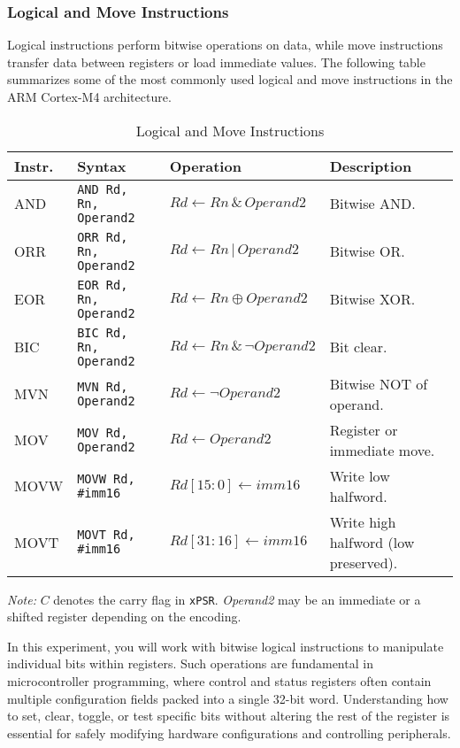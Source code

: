 \subsubsection{Logical and Move Instructions}
Logical instructions perform bitwise operations on data, while move instructions transfer data between registers or load immediate values. The following table summarizes some of the most commonly used logical and move instructions in the ARM Cortex-M4 architecture.
\begin{table}[H]
\centering
\caption{Logical and Move Instructions}
\small
\begin{tabularx}{\linewidth}{@{}l l l X@{}}
\toprule
\textbf{Instr.} & \textbf{Syntax} & \textbf{Operation} & \textbf{Description} \\
\midrule
AND  & \texttt{AND Rd, Rn, Operand2} & $Rd \leftarrow Rn \,\&\, Operand2$ & Bitwise AND. \\
ORR  & \texttt{ORR Rd, Rn, Operand2} & $Rd \leftarrow Rn \,|\, Operand2$ & Bitwise OR. \\
EOR  & \texttt{EOR Rd, Rn, Operand2} & $Rd \leftarrow Rn \oplus Operand2$ & Bitwise XOR. \\
BIC  & \texttt{BIC Rd, Rn, Operand2} & $Rd \leftarrow Rn \,\&\, \neg Operand2$ & Bit clear. \\
MVN  & \texttt{MVN Rd, Operand2}     & $Rd \leftarrow \neg Operand2$ & Bitwise NOT of operand. \\
MOV  & \texttt{MOV Rd, Operand2}     & $Rd \leftarrow Operand2$ & Register or immediate move. \\
MOVW & \texttt{MOVW Rd, \#imm16}     & $Rd[15{:}0] \leftarrow imm16$ & Write low halfword. \\
MOVT & \texttt{MOVT Rd, \#imm16}     & $Rd[31{:}16] \leftarrow imm16$ & Write high halfword (low preserved). \\
\bottomrule
\end{tabularx}

\vspace{2pt}
\footnotesize\emph{Note:} $C$ denotes the carry flag in \texttt{xPSR}. \emph{Operand2} may be an immediate or a shifted register depending on the encoding.
\end{table}

In this experiment, you will work with bitwise logical instructions to manipulate individual bits within registers.
Such operations are fundamental in microcontroller programming, where control and status registers often contain multiple configuration fields packed into a single 32-bit word.
Understanding how to set, clear, toggle, or test specific bits without altering the rest of the register is essential for safely modifying hardware configurations and controlling peripherals.
